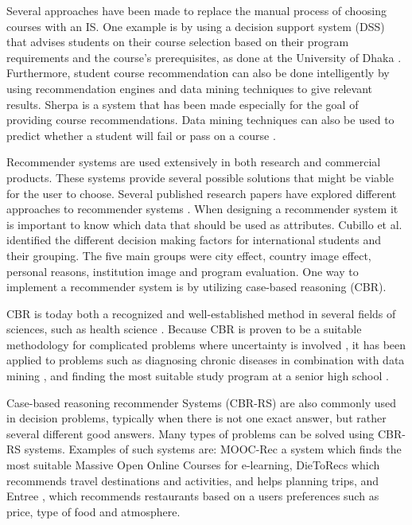 Several approaches have been made to replace the manual process of choosing courses with an IS. One example is by using a decision support system (DSS) that advises students on their course selection based on their program requirements and the course's prerequisites, as done at the University of Dhaka \cite{roushan2014university}. Furthermore, student course recommendation can also be done intelligently by using recommendation engines and data mining techniques to give relevant results. Sherpa \cite{bramucci2012sherpa} is a system that has been made especially for the goal of providing course recommendations. Data mining techniques can also be used to predict whether a student will fail or pass on a course \cite{vialardi2009recommendation}.

Recommender systems are used extensively in both research and commercial products. These systems provide several possible solutions that might be viable for the user to choose. Several published research papers have explored different approaches to recommender systems \cite{mulyana2015case}\cite{quijano2011happy}. When designing a recommender system it is important to know which data that should be used as attributes. Cubillo et al. \cite{maria2006international} identified the different decision making factors for international students and their grouping. The five main groups were city effect, country image effect, personal reasons, institution image and program evaluation. One way to implement a recommender system is by utilizing case-based reasoning (CBR).

CBR is today both a recognized and well-established method in several fields of sciences, such as health science \cite{begum2011case}. Because CBR is proven to be a suitable methodology for complicated problems where uncertainty is involved \cite{richter2013case}, it has been applied to problems such as diagnosing chronic diseases in combination with data mining \cite{huang2007integrating}, and finding the most suitable study program at a senior high school \cite{mulyana2015case}. 

Case-based reasoning recommender Systems (CBR-RS) are also commonly used in decision problems, typically when there is not one exact answer, but rather several different good answers. Many types of problems can be solved using CBR-RS systems. Examples of such systems are: MOOC-Rec \cite{bousbahi2015mooc} a system which finds the most suitable Massive Open Online Courses for e-learning, DieToRecs \cite{fesenmaier2003dietorecs} which recommends travel destinations and activities, and helps planning trips, and Entree \cite{trewin2000knowledge}, which recommends restaurants based on a users preferences such as price, type of food and atmosphere. 

